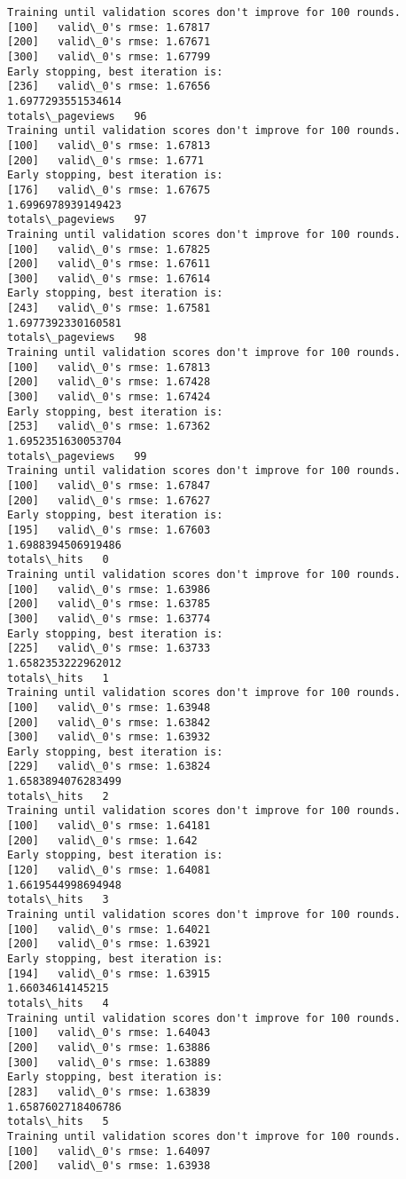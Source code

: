 \documentclass[11pt]{article}
\begin{document}
\begin{Verbatim}[commandchars=\\\{\}]
Training until validation scores don't improve for 100 rounds.
[100]	valid\_0's rmse: 1.67817
[200]	valid\_0's rmse: 1.67671
[300]	valid\_0's rmse: 1.67799
Early stopping, best iteration is:
[236]	valid\_0's rmse: 1.67656
1.6977293551534614
totals\_pageviews   96
Training until validation scores don't improve for 100 rounds.
[100]	valid\_0's rmse: 1.67813
[200]	valid\_0's rmse: 1.6771
Early stopping, best iteration is:
[176]	valid\_0's rmse: 1.67675
1.6996978939149423
totals\_pageviews   97
Training until validation scores don't improve for 100 rounds.
[100]	valid\_0's rmse: 1.67825
[200]	valid\_0's rmse: 1.67611
[300]	valid\_0's rmse: 1.67614
Early stopping, best iteration is:
[243]	valid\_0's rmse: 1.67581
1.6977392330160581
totals\_pageviews   98
Training until validation scores don't improve for 100 rounds.
[100]	valid\_0's rmse: 1.67813
[200]	valid\_0's rmse: 1.67428
[300]	valid\_0's rmse: 1.67424
Early stopping, best iteration is:
[253]	valid\_0's rmse: 1.67362
1.6952351630053704
totals\_pageviews   99
Training until validation scores don't improve for 100 rounds.
[100]	valid\_0's rmse: 1.67847
[200]	valid\_0's rmse: 1.67627
Early stopping, best iteration is:
[195]	valid\_0's rmse: 1.67603
1.6988394506919486
totals\_hits   0
Training until validation scores don't improve for 100 rounds.
[100]	valid\_0's rmse: 1.63986
[200]	valid\_0's rmse: 1.63785
[300]	valid\_0's rmse: 1.63774
Early stopping, best iteration is:
[225]	valid\_0's rmse: 1.63733
1.6582353222962012
totals\_hits   1
Training until validation scores don't improve for 100 rounds.
[100]	valid\_0's rmse: 1.63948
[200]	valid\_0's rmse: 1.63842
[300]	valid\_0's rmse: 1.63932
Early stopping, best iteration is:
[229]	valid\_0's rmse: 1.63824
1.6583894076283499
totals\_hits   2
Training until validation scores don't improve for 100 rounds.
[100]	valid\_0's rmse: 1.64181
[200]	valid\_0's rmse: 1.642
Early stopping, best iteration is:
[120]	valid\_0's rmse: 1.64081
1.6619544998694948
totals\_hits   3
Training until validation scores don't improve for 100 rounds.
[100]	valid\_0's rmse: 1.64021
[200]	valid\_0's rmse: 1.63921
Early stopping, best iteration is:
[194]	valid\_0's rmse: 1.63915
1.66034614145215
totals\_hits   4
Training until validation scores don't improve for 100 rounds.
[100]	valid\_0's rmse: 1.64043
[200]	valid\_0's rmse: 1.63886
[300]	valid\_0's rmse: 1.63889
Early stopping, best iteration is:
[283]	valid\_0's rmse: 1.63839
1.6587602718406786
totals\_hits   5
Training until validation scores don't improve for 100 rounds.
[100]	valid\_0's rmse: 1.64097
[200]	valid\_0's rmse: 1.63938

\end{Verbatim}
\end{document}
